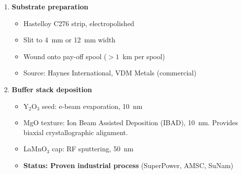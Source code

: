 \documentclass[11pt, a4paper]{article}
\begin{document}
\begin{enumerate}
  \item \textbf{Substrate preparation}
    \begin{itemize}[nosep]
      \item Hastelloy C276 strip, electropolished
      \item Slit to 4~mm or 12~mm width
      \item Wound onto pay-off spool ($> 1$~km per spool)
      \item Source: Haynes International, VDM Metals (commercial)
    \end{itemize}

  \item \textbf{Buffer stack deposition}
    \begin{itemize}[nosep]
      \item Y$_2$O$_3$ seed: e-beam evaporation, 10~nm
      \item MgO texture: Ion Beam Assisted Deposition (IBAD), 10~nm.
            Provides biaxial crystallographic alignment.
      \item LaMnO$_3$ cap: RF sputtering, 50~nm
      \item \textcolor{nm-green}{\textbf{Status: Proven industrial
            process}} (SuperPower, AMSC, SuNam)
    \end{itemize}


\end{enumerate}
\end{document}
